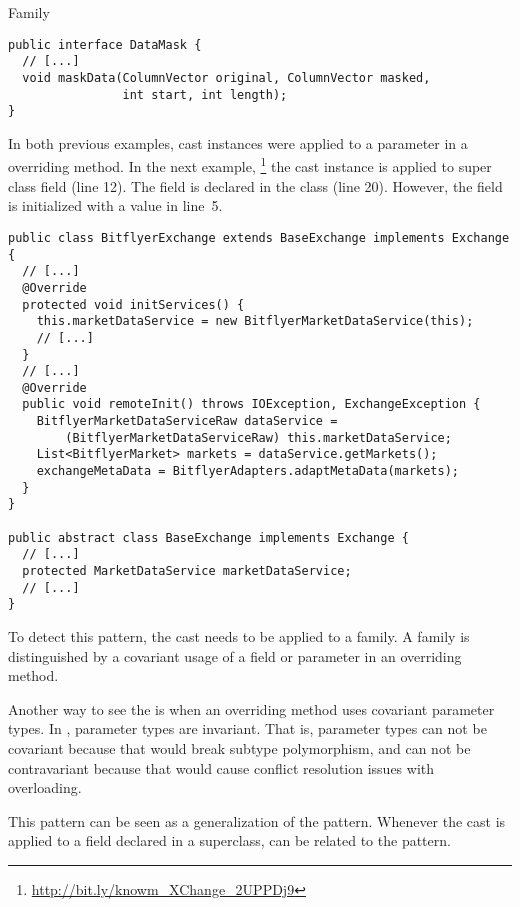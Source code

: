 \begin{pattern}{Family}
\begin{verbatim}
public interface DataMask {
  // [...]
  void maskData(ColumnVector original, ColumnVector masked,
                int start, int length);
}

\end{verbatim}

In both previous examples,
cast instances were applied to a parameter in a overriding method.
In the next example,%
\footnote{\url{http://bit.ly/knowm_XChange_2UPPDj9}}
the cast instance is applied to super class field (line 12).
The field is declared in the  class (line 20).
However, the field is initialized with a  value in line~5.

\begin{verbatim}
public class BitflyerExchange extends BaseExchange implements Exchange {
  // [...]
  @Override
  protected void initServices() {
    this.marketDataService = new BitflyerMarketDataService(this);
    // [...]
  }
  // [...]
  @Override
  public void remoteInit() throws IOException, ExchangeException {
    BitflyerMarketDataServiceRaw dataService =
        (BitflyerMarketDataServiceRaw) this.marketDataService;
    List<BitflyerMarket> markets = dataService.getMarkets();
    exchangeMetaData = BitflyerAdapters.adaptMetaData(markets);
  }
}

public abstract class BaseExchange implements Exchange {
  // [...]
  protected MarketDataService marketDataService;
  // [...]
}
\end{verbatim}

\detection{}
To detect this pattern, the cast needs to be applied to a family.
A family is distinguished by a covariant usage of a field or parameter in an overriding method.

\discussion{}
Another way to see the \thisp{} is when an overriding method uses covariant parameter types.
In \java{}, parameter types are invariant.
That is, parameter types can not be covariant because that would break subtype polymorphism,
and can not be contravariant because that would cause conflict resolution issues with overloading.


\related{}
This pattern can be seen as a generalization of the  pattern.
Whenever the cast is applied to a field declared in a superclass,
\thisp{} can be related to the  pattern.

\end{pattern}